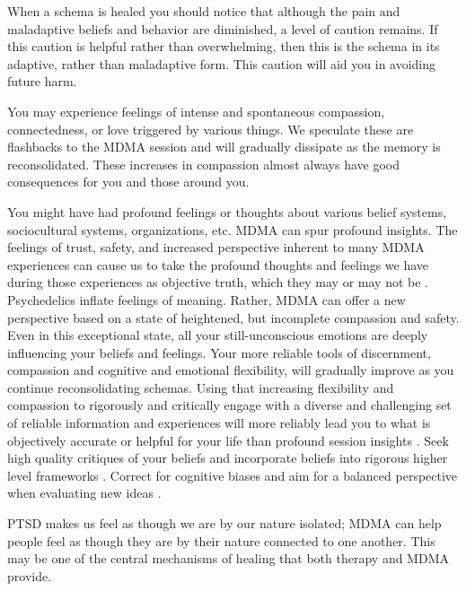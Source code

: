\documentclass[12pt,letterpaper]{article}
\begin{document}
When a schema is healed you should notice that although the pain and maladaptive beliefs and behavior are diminished, a level of caution remains. If this caution is helpful rather than overwhelming, then this is the schema in its adaptive, rather than maladaptive form. This caution will aid you in avoiding future harm.

You may experience feelings of intense and spontaneous compassion, connectedness, or love triggered by various things. We speculate these are flashbacks to the MDMA session and will gradually dissipate as the memory is reconsolidated. These increases in compassion almost always have good consequences for you and those around you.

You might have had profound feelings or thoughts about various belief systems, sociocultural systems, organizations, etc. MDMA can spur profound insights. The feelings of trust, safety, and increased perspective inherent to many MDMA experiences can cause us to take the profound thoughts and feelings we have during those experiences as objective truth, which they may or may not be \cite{hartogsohn2018meaning}. Psychedelics inflate feelings of meaning. Rather, MDMA can offer a new perspective based on a state of heightened, but incomplete compassion and safety. Even in this exceptional state, all your still-unconscious emotions are deeply influencing your beliefs and feelings. Your more reliable tools of discernment, compassion and cognitive and emotional flexibility, will gradually improve as you continue reconsolidating schemas. Using that increasing flexibility and compassion to rigorously and critically engage with a diverse and challenging set of reliable information and experiences will more reliably lead you to what is objectively accurate or helpful for your life than profound session insights \cite{bentzMindfulInquiry}. Seek high quality critiques of your beliefs and incorporate beliefs into rigorous higher level frameworks \cite{saganDemon}. Correct for cognitive biases and aim for a balanced perspective when evaluating new ideas \cite{galefScoutMindset}.

PTSD makes us feel as though we are by our nature isolated; MDMA can help people feel as though they are by their nature connected to one another. This may be one of the central mechanisms of healing that both therapy and MDMA provide.
\end{document}
